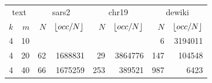 \begin{table}[p]
\vspace*{\fill}
\begin{minipage}[c]{0.49\textwidth}
\centering
\fontsize{6.5pt}{7.6pt}\selectfont
\setlength{\tabcolsep}{2pt}
\renewcommand{\arraystretch}{1.18}
\begin{tabular}{|rr|rr|rr|rr|}
\hline
\multicolumn{2}{|c|}{text}
& \multicolumn{2}{c|}{sars2}
& \multicolumn{2}{c|}{chr19}
& \multicolumn{2}{c|}{dewiki} \\
$k$ & $m$
& $N$ & $\lfloor occ/N \rfloor$
& $N$ & $\lfloor occ/N \rfloor$
& $N$ & $\lfloor occ/N \rfloor$ \\
\hline
\num{4} &   \num{10} &          &               &             &               &    \num{6} & \num{3194011} \\
\num{4} &   \num{20} & \num{62} & \num{1688831} &    \num{29} & \num{3864776} &  \num{147} &  \num{104548} \\
\num{4} &   \num{40} & \num{66} & \num{1675259} &   \num{253} &  \num{389521} &  \num{987} &    \num{6423} \\

\end{tabular}
\end{minipage}
\end{table}
